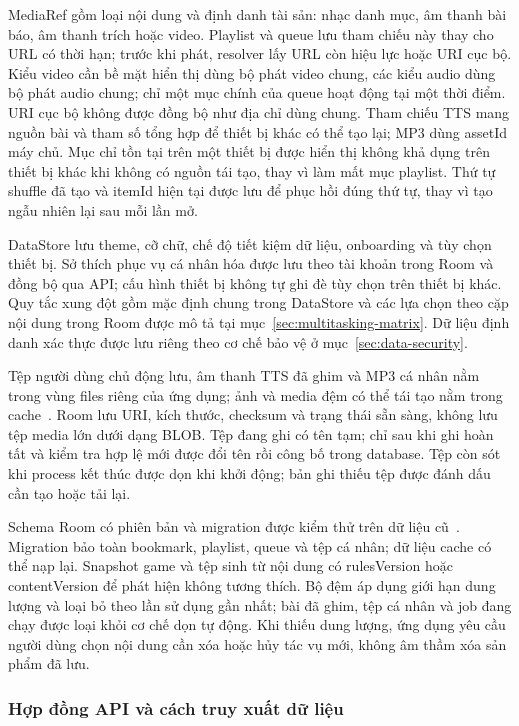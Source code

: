 MediaRef gồm loại nội dung và định danh tài sản: nhạc danh mục, âm thanh bài báo, âm thanh trích hoặc video. Playlist và queue lưu tham chiếu này thay cho URL có thời hạn; trước khi phát, resolver lấy URL còn hiệu lực hoặc URI cục bộ. Kiểu video cần bề mặt hiển thị dùng bộ phát video chung, các kiểu audio dùng bộ phát audio chung; chỉ một mục chính của queue hoạt động tại một thời điểm. URI cục bộ không được đồng bộ như địa chỉ dùng chung. Tham chiếu TTS mang nguồn bài và tham số tổng hợp để thiết bị khác có thể tạo lại; MP3 dùng assetId máy chủ. Mục chỉ tồn tại trên một thiết bị được hiển thị không khả dụng trên thiết bị khác khi không có nguồn tái tạo, thay vì làm mất mục playlist. Thứ tự shuffle đã tạo và itemId hiện tại được lưu để phục hồi đúng thứ tự, thay vì tạo ngẫu nhiên lại sau mỗi lần mở.

DataStore lưu theme, cỡ chữ, chế độ tiết kiệm dữ liệu, onboarding và tùy chọn thiết bị. Sở thích phục vụ cá nhân hóa được lưu theo tài khoản trong Room và đồng bộ qua API; cấu hình thiết bị không tự ghi đè tùy chọn trên thiết bị khác. Quy tắc xung đột gồm mặc định chung trong DataStore và các lựa chọn theo cặp nội dung trong Room được mô tả tại mục~\ref{sec:multitasking-matrix}. Dữ liệu định danh xác thực được lưu riêng theo cơ chế bảo vệ ở mục~\ref{sec:data-security}.

Tệp người dùng chủ động lưu, âm thanh TTS đã ghim và MP3 cá nhân nằm trong vùng files riêng của ứng dụng; ảnh và media đệm có thể tái tạo nằm trong cache~\cite{android-app-files}. Room lưu URI, kích thước, checksum và trạng thái sẵn sàng, không lưu tệp media lớn dưới dạng BLOB. Tệp đang ghi có tên tạm; chỉ sau khi ghi hoàn tất và kiểm tra hợp lệ mới được đổi tên rồi công bố trong database. Tệp còn sót khi process kết thúc được dọn khi khởi động; bản ghi thiếu tệp được đánh dấu cần tạo hoặc tải lại.

Schema Room có phiên bản và migration được kiểm thử trên dữ liệu cũ~\cite{android-room-migrations}. Migration bảo toàn bookmark, playlist, queue và tệp cá nhân; dữ liệu cache có thể nạp lại. Snapshot game và tệp sinh từ nội dung có rulesVersion hoặc contentVersion để phát hiện không tương thích. Bộ đệm áp dụng giới hạn dung lượng và loại bỏ theo lần sử dụng gần nhất; bài đã ghim, tệp cá nhân và job đang chạy được loại khỏi cơ chế dọn tự động. Khi thiếu dung lượng, ứng dụng yêu cầu người dùng chọn nội dung cần xóa hoặc hủy tác vụ mới, không âm thầm xóa sản phẩm đã lưu.

\subsubsection{Hợp đồng API và cách truy xuất dữ liệu}
\label{sec:data-api}

